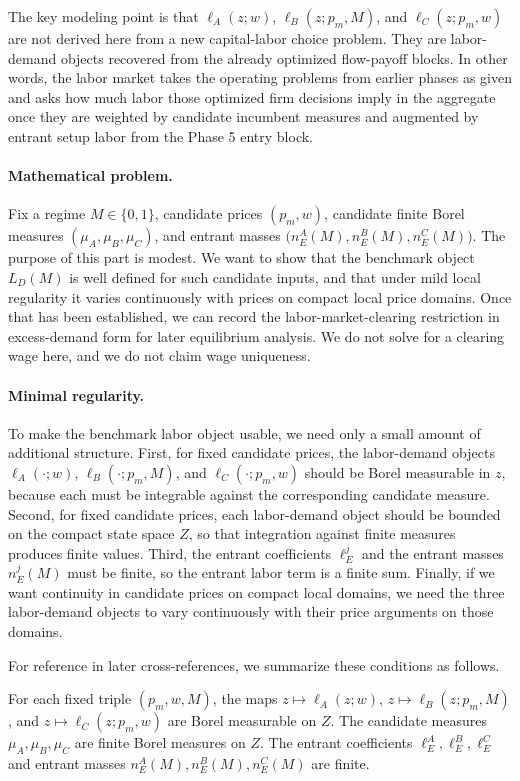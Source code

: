The key modeling point is that $\ell_A(z;w)$, $\ell_B(z;p_m,M)$, and $\ell_C(z;p_m,w)$ are not derived here from a new capital-labor choice problem. They are labor-demand objects recovered from the already optimized flow-payoff blocks. In other words, the labor market takes the operating problems from earlier phases as given and asks how much labor those optimized firm decisions imply in the aggregate once they are weighted by candidate incumbent measures and augmented by entrant setup labor from the Phase 5 entry block.

\paragraph{Mathematical problem.}
Fix a regime $M\in\{0,1\}$, candidate prices $(p_m,w)$, candidate finite Borel measures $(\mu_A,\mu_B,\mu_C)$, and entrant masses $\bigl(n_E^A(M),n_E^B(M),n_E^C(M)\bigr)$. The purpose of this part is modest. We want to show that the benchmark object $L_D(M)$ is well defined for such candidate inputs, and that under mild local regularity it varies continuously with prices on compact local price domains. Once that has been established, we can record the labor-market-clearing restriction in excess-demand form for later equilibrium analysis. We do not solve for a clearing wage here, and we do not claim wage uniqueness.

\paragraph{Minimal regularity.}
To make the benchmark labor object usable, we need only a small amount of additional structure. First, for fixed candidate prices, the labor-demand objects $\ell_A(\cdot;w)$, $\ell_B(\cdot;p_m,M)$, and $\ell_C(\cdot;p_m,w)$ should be Borel measurable in $z$, because each must be integrable against the corresponding candidate measure. Second, for fixed candidate prices, each labor-demand object should be bounded on the compact state space $Z$, so that integration against finite measures produces finite values. Third, the entrant coefficients $\ell_E^j$ and the entrant masses $n_E^j(M)$ must be finite, so the entrant labor term is a finite sum. Finally, if we want continuity in candidate prices on compact local domains, we need the three labor-demand objects to vary continuously with their price arguments on those domains.

For reference in later cross-references, we summarize these conditions as follows.
\begin{assumption}
\label{ass:p6_lab_meas}
For each fixed triple $(p_m,w,M)$, the maps $z\mapsto \ell_A(z;w)$, $z\mapsto \ell_B(z;p_m,M)$, and $z\mapsto \ell_C(z;p_m,w)$ are Borel measurable on $Z$. The candidate measures $\mu_A,\mu_B,\mu_C$ are finite Borel measures on $Z$. The entrant coefficients $\ell_E^A,\ell_E^B,\ell_E^C$ and entrant masses $n_E^A(M),n_E^B(M),n_E^C(M)$ are finite.
\end{assumption}

